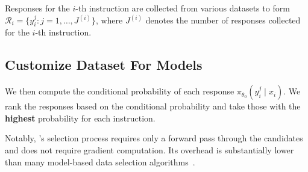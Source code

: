 Responses for the $i$-th instruction are collected from various datasets to form $\mathcal{R}_i =\{y{_i^j} : j = 1, \dots, J^{(i)}\}$, where $J^{(i)}$ denotes the number of responses collected for the $i$-th instruction.
\subsection{Customize Dataset For Models}
\label{sec:method_customization}
We then compute the conditional probability of each response \(\pi_{\theta_0}(y{_i^j}\mid x_i)\). We rank the responses based on the conditional probability and take those with the \textbf{highest} probability for each instruction.



Notably, \name's selection process requires only a forward pass through the candidates and does not require gradient computation.
Its overhead is substantially lower than many model-based data selection algorithms~\cite{xia2024less,yang2024s2l,liu2024deita,zhao2021datasetcondensationgradientmatching,zhang2024tagcostaskagnosticgradientclustered,pan2024scalebioscalablebileveloptimization}.


